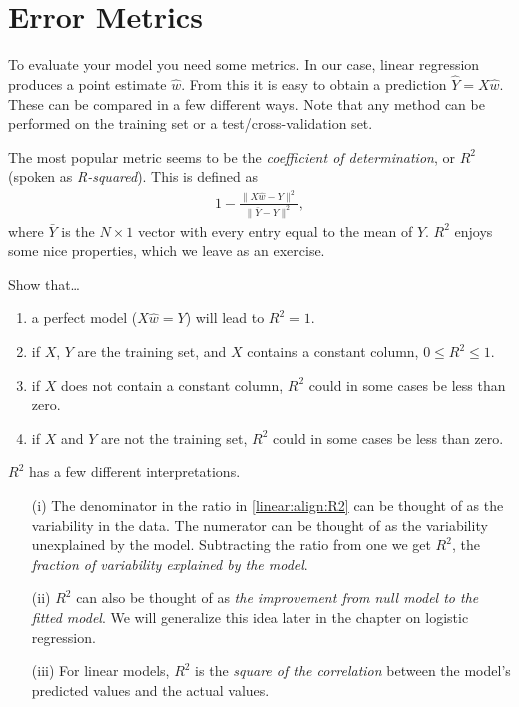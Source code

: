 \section{Error Metrics}
To evaluate your model you need some metrics.  In our case, linear regression produces a point estimate $\hat w$.  From this it is easy to obtain a prediction $\hat Y = X\hat w$.  These can be compared in a few different ways.  Note that any method can be performed on the training set or a test/cross-validation set.

The most popular metric seems to be the \emph{coefficient of determination}, or $R^2$ (spoken as \emph{R-squared}).  This is defined as
\begin{align}
  1 - \frac{\|X\hat w - Y\|^2}{\|\bar Y- Y\|^2},
  \label{linear:align:R2}
\end{align}
where $\bar Y$ is the $N\times1$ vector with every entry equal to the mean of $Y$.  $R^2$ enjoys some nice properties, which we leave as an exercise.

\begin{exercise}
  Show that\ldots
\begin{enumerate}
  \item a perfect model ($X\hat w = Y$) will lead to $R^2=1$.
  \item if $X$, $Y$ are the training set, and $X$ contains a constant column, $0\leq R^2 \leq 1$.
  \item if $X$ does not contain a constant column, $R^2$ could in some cases be less than zero.
  \item if $X$ and $Y$ are not the training set, $R^2$ could in some cases be less than zero.
\end{enumerate}
\end{exercise}

$R^2$ has a few different interpretations.
\begin{enumerate}
  \item[(i)]  The denominator in the ratio in \eqref{linear:align:R2} can be thought of as the variability in the data.  The numerator can be thought of as the variability unexplained by the model.  Subtracting the ratio from one we get $R^2$, the \emph{fraction of variability explained by the model}.
  \item[(ii)] $R^2$ can also be thought of as \emph{the improvement from null model to the fitted model}.  We will generalize this idea later in the chapter on logistic regression.
  \item[(iii)] For linear models, $R^2$ is the \emph{square of the correlation} between the model's predicted values and the actual values.
\end{enumerate}

